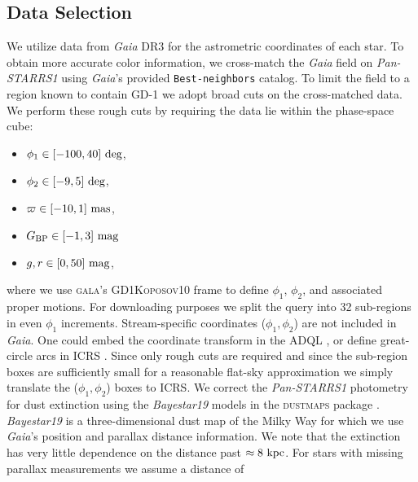 \documentclass[twocolumn, linenumbers]{aastex631}
\newcommand{\code}[1]{\textsc{#1}}
\newcommand{\package}[1]{\code{#1}}
\newcommand{\stream}[1]{#1}
\newcommand{\dataarchive}[1]{\textit{#1}}
\newcommand{\Gaia}{\dataarchive{Gaia}}
\newcommand{\PanStarrs}{\dataarchive{Pan-STARRS1}}
\newcommand{\parallax}{\varpi}
\begin{document}
    \subsection{Data Selection} \label{sub:results_gd1:data}

        We utilize data from \Gaia{} DR3 for the astrometric coordinates of each
        star.  To obtain more accurate color information, we cross-match the
        \Gaia{} field on \PanStarrs{} \citep{PanSTARRS1} using \Gaia's provided
        \texttt{Best-neighbors} catalog.  To limit the field to a region known
        to contain \stream{GD-1} we adopt broad cuts on the cross-matched data.
        We perform these rough cuts by requiring the data lie within the
        phase-space cube:
        \begin{itemize}
            \setlength\itemsep{0em}
            \item $\phi_1 \in [-100, 40] \ \rm{deg}$,
            \item $\phi_2 \in [-9, 5] \ \rm{deg}$,
            \item $\parallax \in [-10, 1] \ \rm{mas}$,
            \item $G_{\rm BP} \in [-1, 3] \ \rm{mag}$
            \item $g, r \in [0, 50] \ \rm{mag}$, %
        \end{itemize}
        where we use \package{gala}'s \citep{gala, galav1.3} \code{GD1Koposov10}
        frame \citep{Koposov+2010} to define $\phi_1$, $\phi_2$, and associated
        proper motions.  For downloading purposes we split the query into 32
        sub-regions in even $\phi_1$ increments.  Stream-specific coordinates
        ($\phi_1, \phi_2$) are not included in \Gaia.  One could embed the
        coordinate transform in the ADQL \citep{ADQL2.0}, or define great-circle
        arcs in ICRS \citep{ICRS1997}. Since only rough cuts are required and
        since the sub-region boxes are sufficiently small for a reasonable
        flat-sky approximation  we simply translate the ($\phi_1, \phi_2$) boxes
        to ICRS.  We correct the \PanStarrs{} photometry for dust extinction
        using the \textit{Bayestar19} \citep{Green+2019} models in the
        \package{dustmaps} package \citep{Green2018}.  \textit{Bayestar19} is a
        three-dimensional dust map of the Milky Way for which we use \Gaia's
        position and parallax distance information. We note that the extinction
        has very little dependence on the distance past $\approx 8 \ \rm{kpc}$.
        For stars with missing parallax measurements we assume a distance of
\end{document}
